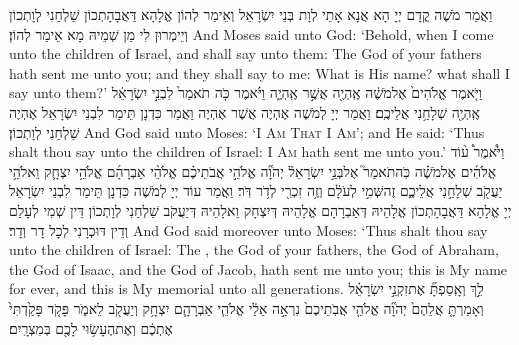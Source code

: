 {וַאֲמַר מֹשֶׁה קֳדָם יְיָ הָא אֲנָא אָתֵי לְוָת בְּנֵי יִשְׂרָאֵל וְאֵימַר לְהוֹן אֱלָהָא דַּאֲבָהָתְכוֹן שַׁלְחַנִי לְוָתְכוֹן וְיֵימְרוּן לִי מַן שְׁמֵיהּ מָא אֵימַר לְהוֹן׃}
{And Moses said unto God: ‘Behold, when I come unto the children of Israel, and shall say unto them: The God of your fathers hath sent me unto you; and they shall say to me: What is His name? what shall I say unto them?’}{}
{וַיֹּ֤אמֶר אֱלֹהִים֙ אֶל\maqqaf מֹשֶׁ֔ה אֶֽהְיֶ֖ה אֲשֶׁ֣ר אֶֽהְיֶ֑ה וַיֹּ֗אמֶר כֹּ֤ה תֹאמַר֙ לִבְנֵ֣י יִשְׂרָאֵ֔ל אֶֽהְיֶ֖ה שְׁלָחַ֥נִי אֲלֵיכֶֽם׃}
{וַאֲמַר יְיָ לְמֹשֶׁה אֶהְיֶה אֲשֶׁר אֶהְיֶה וַאֲמַר כִּדְנָן תֵּימַר לִבְנֵי יִשְׂרָאֵל אֶהְיֶה שַׁלְחַנִי לְוָתְכוֹן׃}
{And God said unto Moses: ‘\textsc{I Am That I Am}’; and He said: ‘Thus shalt thou say unto the children of Israel: \textsc{I Am} hath sent me unto you.’}{}
{וַיֹּ֩אמֶר֩ ע֨וֹד אֱלֹהִ֜ים אֶל\maqqaf מֹשֶׁ֗ה כֹּֽה\maqqaf תֹאמַר֮ אֶל\maqqaf בְּנֵ֣י יִשְׂרָאֵל֒ יְהֹוָ֞ה אֱלֹהֵ֣י אֲבֹתֵיכֶ֗ם אֱלֹהֵ֨י אַבְרָהָ֜ם אֱלֹהֵ֥י יִצְחָ֛ק וֵאלֹהֵ֥י יַעֲקֹ֖ב שְׁלָחַ֣נִי אֲלֵיכֶ֑ם זֶה\maqqaf שְּׁמִ֣י לְעֹלָ֔ם וְזֶ֥ה זִכְרִ֖י לְדֹ֥ר דֹּֽר׃}
{וַאֲמַר עוֹד יְיָ לְמֹשֶׁה כִּדְנָן תֵּימַר לִבְנֵי יִשְׂרָאֵל יְיָ אֱלָהָא דַּאֲבָהָתְכוֹן אֱלָהֵיהּ דְּאַבְרָהָם אֱלָהֵיהּ דְּיִצְחָק וֵאלָהֵיהּ דְּיַעֲקֹב שַׁלְחַנִי לְוָתְכוֹן דֵּין שְׁמִי לְעָלַם וְדֵין דּוּכְרָנִי לְכָל דָר וְדָר׃}
{And God said moreover unto Moses: ‘Thus shalt thou say unto the children of Israel: The \lord, the God of your fathers, the God of Abraham, the God of Isaac, and the God of Jacob, hath sent me unto you; this is My name for ever, and this is My memorial unto all generations.}{}
{לֵ֣ךְ וְאָֽסַפְתָּ֞ אֶת\maqqaf זִקְנֵ֣י יִשְׂרָאֵ֗ל וְאָמַרְתָּ֤ אֲלֵהֶם֙ יְהֹוָ֞ה אֱלֹהֵ֤י אֲבֹֽתֵיכֶם֙ נִרְאָ֣ה אֵלַ֔י אֱלֹהֵ֧י אַבְרָהָ֛ם יִצְחָ֥ק וְיַעֲקֹ֖ב לֵאמֹ֑ר פָּקֹ֤ד פָּקַ֙דְתִּי֙ אֶתְכֶ֔ם וְאֶת\maqqaf הֶעָשׂ֥וּי לָכֶ֖ם בְּמִצְרָֽיִם׃}
